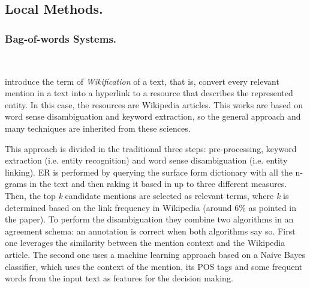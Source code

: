 

\subsection{Local Methods.}

\subsubsection{Bag-of-words Systems.}~

\medskip

\cite{mihalcea2007} introduce the term of \emph{Wikification} of a text, that is, convert every relevant mention in a text into a hyperlink to a resource that describes the represented entity. In this case, the resources are Wikipedia articles. This works are based on word sense disambiguation and keyword extraction, so the general approach and many techniques are inherited from these sciences.

This approach is divided in the traditional three steps: pre-processing, keyword extraction (i.e. entity recognition) and word sense disambiguation (i.e. entity linking). ER is performed by querying the surface form dictionary with all the n-grams in the text and then raking it based in up to three different measures. Then, the top \emph{k} candidate mentions are selected as relevant terms, where \textit{k} is determined based on the link frequency in Wikipedia (around 6\% as pointed in the paper). To perform the disambiguation they combine two algorithms in an agreement schema: an annotation is correct when both algorithms say so. First one leverages the similarity between the mention context and the Wikipedia article. The second one uses a machine learning approach based on a Naive Bayes classifier, which uses the context of the mention, its POS tags and some frequent words from the input text as features for the decision making.

\medskip

